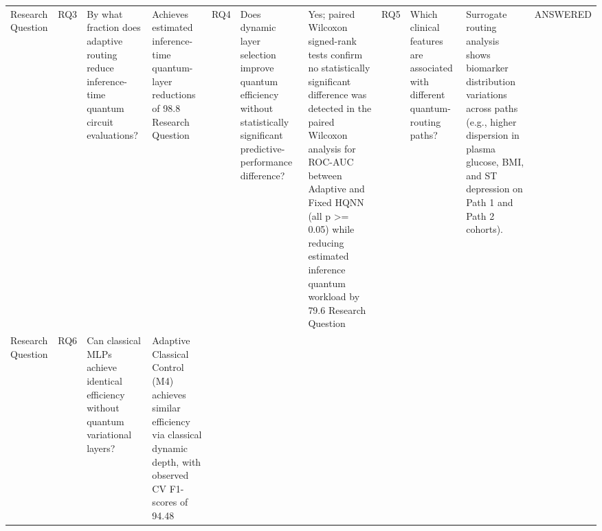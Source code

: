 \begin{table}
\begin{tabular}{lllll}
Research Question & RQ3 & By what fraction does adaptive routing reduce inference-time quantum circuit evaluations? & Achieves estimated inference-time quantum-layer reductions of 98.8%
Research Question & RQ4 & Does dynamic layer selection improve quantum efficiency without statistically significant predictive-performance difference? & Yes; paired Wilcoxon signed-rank tests confirm no statistically significant difference was detected in the paired Wilcoxon analysis for ROC-AUC between Adaptive and Fixed HQNN (all p >= 0.05) while reducing estimated inference quantum workload by 79.6%
Research Question & RQ5 & Which clinical features are associated with different quantum-routing paths? & Surrogate routing analysis shows biomarker distribution variations across paths (e.g., higher dispersion in plasma glucose, BMI, and ST depression on Path 1 and Path 2 cohorts). & ANSWERED \\
Research Question & RQ6 & Can classical MLPs achieve identical efficiency without quantum variational layers? & Adaptive Classical Control (M4) achieves similar efficiency via classical dynamic depth, with observed CV F1-scores of 94.48%
\bottomrule
\end{tabular}
\end{table}
